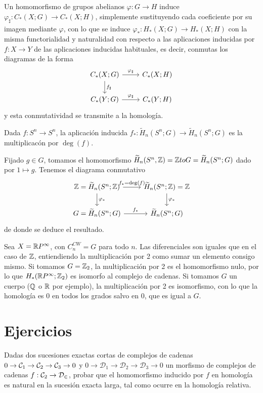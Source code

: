\documentclass[TA.tex]{subfiles}
\begin{document}
Un homomorfismo de grupos abelianos $\varphi:G\to H$  induce $\varphi_\sharp:C_*(X;G)\to C_*(X;H)$, simplemente sustituyendo cada coeficiente por su imagen mediante $\varphi$, con lo que se induce $\varphi_*:H_*(X;G)\to H_*(X;H)$ con la misma functorialidad y naturalidad con respecto a las aplicaciones inducidas por $f:X\to Y$ de las aplicaciones inducidas habituales, es decir, conmutas los diagramas de la forma
\[
\begin{tikzcd}
C_*(X;G)\arrow[r, "\varphi_\sharp"]\arrow[d, "f_\sharp"] & C_*(X;H)\\
C_*(Y;G)\arrow[r, "\varphi_\sharp"] & C_*(Y;H)
\end{tikzcd}
\]
y esta conmutatividad se transmite a la homología.
 
 \begin{prop}
 Dada $f:S^n\to S^n$, la aplicación inducida $f_*:\widetilde{H}_n(S^n;G)\to\widetilde{H}_n(S^n;G)$ es la multiplicacón por $\deg(f)$. 
 \end{prop}
\begin{dem}
Fijado $g\in G$, tomamos el homomorfismo $\widetilde{H}_n(S^n,\mathbb{Z})=\mathbb{Z} to G=\widetilde{H}_n(S^n;G)$ dado por $1\mapsto g$. Tenemos el diagrama conmutativo
\[
\begin{tikzcd}
\Z=\widetilde{H}_n(S^n;\Z)\arrow[r, "f_*=\deg(f)"]\arrow[d, "\varphi_*"] & \widetilde{H}_n(S^n;\Z)=\Z\arrow[d, "\varphi_*"]\\
G=\widetilde{H}_n(S^n;G)\arrow[r, "f_*"] &\widetilde{H}_n(S^n;G)
\end{tikzcd}
\]
de donde se deduce el resultado.
\end{dem}


\begin{ej}
Sea $X=\mathbb{R} P^{\infty}$, con $C_n^{CW}=G$ para todo $n$. Las diferenciales son iguales que en el caso de $\mathbb{Z}$, entiendiendo la multiplicación por 2 como sumar un elemento consigo mismo. Si tomamos $G=\mathbb{Z}_2$, la multiplicación por 2 es el homomorfismo nulo, por lo que $H_*(\mathbb{R} P^{\infty};\mathbb{Z}_2)$ es isomorfo al complejo de cadenas. Si tomamos $G$ un cuerpo ($\mathbb{Q}$ o $\mathbb{R}$ por ejemplo), la multiplicación por 2 es isomorfismo, con lo que la homología es 0 en todos los grados salvo en 0, que es igual a $G$. 
\end{ej}



\section{Ejercicios}
\begin{ejer}
Dadas dos sucesiones exactas cortas de complejos de cadenas $0\to \mathcal{C}_1\to \mathcal{C}_2\to\mathcal{C}_3\to 0$ y $0\to \mathcal{D}_1\to \mathcal{D}_2\to\mathcal{D}_3\to 0$ un morfismo de complejos de cadenas $f:\mathcal{C}_2\to\mathcal{D_2}$, probar que el homomorfismo inducido por $f$ en homología es natural en la sucesión exacta larga, tal como ocurre en la homología relativa. 
\end{ejer}
\end{document}
